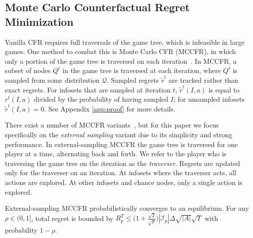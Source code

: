 \documentclass{article}
\begin{document}
\subsection{Monte Carlo Counterfactual Regret Minimization}
\vspace{-0.03in}
Vanilla CFR requires full traversals of the game tree, which is infeasible in large games. One method to combat this is Monte Carlo CFR (MCCFR), in which only a portion of the game tree is traversed on each iteration~\cite{Lanctot09:Monte}.  In MCCFR, a subset of nodes $Q^t$ in the game tree is traversed at each iteration, where $Q^t$ is sampled from some distribution $\mathcal{Q}$. 
Sampled regrets $\tilde{r}^t$ are tracked rather than exact regrets. For infosets that are sampled at iteration $t$, $\tilde{r}^t(I, a)$ is equal to $r^t(I,a)$ divided by the probability of having sampled $I$; for unsampled infosets $\tilde{r}^t(I,a)=0$.
See Appendix \ref{app:proof} for more details.

There exist a number of MCCFR variants~\cite{Gibson12:Generalized,Johanson12:Efficient,Jackson17:Targeted}, but for this paper we focus specifically on the \emph{external sampling} variant due to its simplicity and strong performance. In external-sampling MCCFR the game tree is traversed for one player at a time, alternating back and forth. We refer to the player who is traversing the game tree on the iteration as the \emph{traverser}. Regrets are updated only for the traverser on an iteration. At infosets where the traverser acts, all actions are explored. At other infosets and chance nodes, only a single action is explored. 

External-sampling MCCFR probabilistically converges to an equilibrium. For any $\rho \in (0,1]$, total regret is bounded by $R_p^T \le \big(1 + \frac{\sqrt{2}}{\sqrt{\rho}}\big) |\mathcal{I}_p| \Delta \sqrt{|A|}\sqrt{T}$ with probability $1-\rho$.
\end{document}

